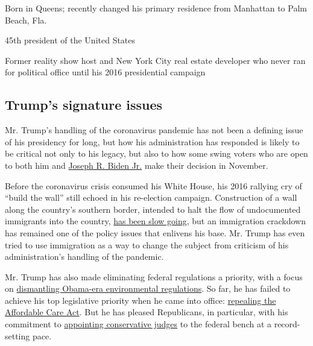 Born in Queens; recently changed his primary residence from Manhattan to
Palm Beach, Fla.

45th president of the United States

Former reality show host and New York City real estate developer who
never ran for political office until his 2016 presidential campaign

\hypertarget{trumps-signature-issues}{%
\subsection{Trump's signature issues}\label{trumps-signature-issues}}

Mr. Trump's handling of the coronavirus pandemic has not been a defining
issue of his presidency for long, but how his administration has
responded is likely to be critical not only to his legacy, but also to
how some swing voters who are open to both him and
\href{https://www.nytimes3xbfgragh.onion/interactive/2020/us/elections/joe-biden.html}{Joseph
R. Biden Jr.} make their decision in November.

Before the coronavirus crisis consumed his White House, his 2016
rallying cry of ``build the wall'' still echoed in his re-election
campaign. Construction of a wall along the country's southern border,
intended to halt the flow of undocumented immigrants into the country,
\href{https://www.nytimes3xbfgragh.onion/2019/11/08/us/border-wall-texas.html}{has
been slow going}, but an immigration crackdown has remained one of the
policy issues that enlivens his base. Mr. Trump has even tried to use
immigration as a way to change the subject from criticism of his
administration's handling of the pandemic.

Mr. Trump has also made eliminating federal regulations a priority, with
a focus on
\href{https://www.nytimes3xbfgragh.onion/interactive/2019/climate/trump-environment-rollbacks.html}{dismantling
Obama-era environmental regulations}. So far, he has failed to achieve
his top legislative priority when he came into office:
\href{https://www.nytimes3xbfgragh.onion/2019/05/01/health/unconstitutional-trump-aca.html}{repealing
the Affordable Care Act}. But he has pleased Republicans, in particular,
with his commitment to
\href{https://www.nytimes3xbfgragh.onion/2020/03/14/us/trump-appeals-court-judges.html}{appointing
conservative judges} to the federal bench at a record-setting pace.

